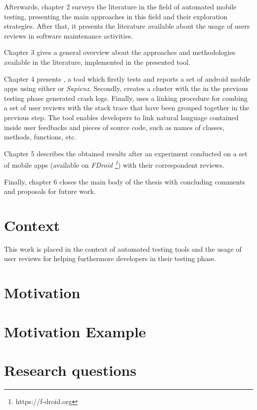 Afterwards, chapter 2 surveys the literature in the field of automated mobile testing, presenting the main approaches in this field and their exploration strategies. After that, it presents the literature available about the usage of users reviews in software maintenance activities. 

Chapter 3 gives a general overview about the approaches and methodologies available in the literature, implemented in the presented tool. 

Chapter 4 presents \toolname, a tool which firstly tests and reports a set of android mobile apps using either \monkey or \textit{Sapienz}.  Secondly, creates a cluster with the in the previous testing phase generated crash logs. Finally, uses a linking procedure for combing a set of user reviews with the stack trace that have been grouped together in the previous step. The tool enables developers to link natural language contained inside user feedbacks and pieces of source code, such as names of classes, methods, functions, etc. 

Chapter 5 describes the obtained results after an experiment conducted on a set of mobile apps (available on \textit{FDroid \footnote{https://f-droid.org}}) with their correspondent reviews. 

Finally, chapter 6 closes the main body of the thesis with concluding comments and proposals for future work.





\section{Context}
This work is placed in the context of automated testing tools and the usage of user reviews for helping furthermore developers in their testing phase. 

\section{Motivation}
\section{Motivation Example}
\section{Research questions}